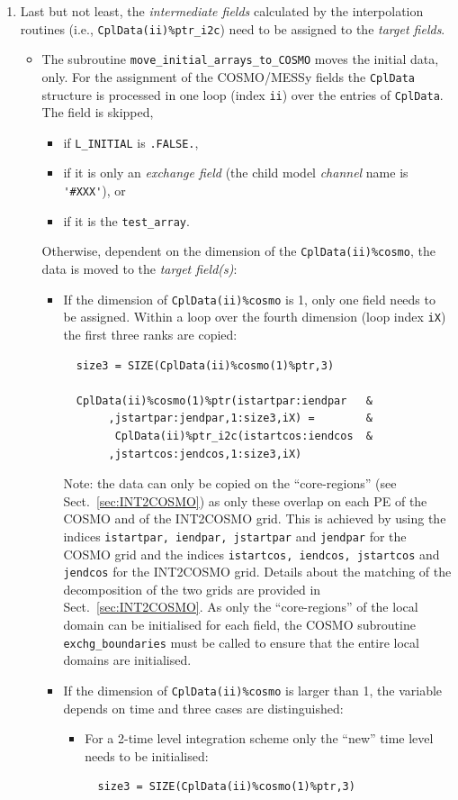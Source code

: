 \documentclass[11pt,twoside]{article}
\begin{document}
\begin{enumerate}
\item Last but not least, the {\it intermediate fields}
 calculated by the interpolation routines (i.e., \verb|CplData(ii)%ptr_i2c|) 
need to be assigned to the {\it target fields}.  
\begin{itemize} %
\item The subroutine \verb|move_initial_arrays_to_COSMO| moves the initial
data, only.
For the assignment of the COSMO/MESSy fields the \verb|CplData| structure is
processed in one loop (index \verb|ii|) over the entries of \verb|CplData|.
The field is skipped,
\begin{itemize}
\item  if \verb|L_INITIAL| is \verb|.FALSE.|,
\item if it is only an {\it exchange field} (the child model {\it
channel} name is \verb|'#XXX'|), or 
\item if it is the \verb|test_array|. 
\end{itemize}
Otherwise, dependent on the dimension of the 
\verb|CplData(ii)%cosmo|, the data is moved to the {\it target field(s)}:
\begin{itemize}
\item If the dimension of \verb|CplData(ii)%cosmo| is 1, only one field 
      needs to be assigned. Within a loop over the fourth dimension (loop index
      \verb|iX|) the first three ranks are copied:
\begin{verbatim}
  size3 = SIZE(CplData(ii)%cosmo(1)%ptr,3)

  CplData(ii)%cosmo(1)%ptr(istartpar:iendpar   &
       ,jstartpar:jendpar,1:size3,iX) =        &
        CplData(ii)%ptr_i2c(istartcos:iendcos  &
       ,jstartcos:jendcos,1:size3,iX)
\end{verbatim} 
Note: the data can only be copied on the ``core-regions'' (see Sect.\ 
\ref{sec:INT2COSMO}) as only these
 overlap on each PE of the COSMO and of the INT2COSMO grid. 
This is achieved by using the indices 
\verb|istartpar, iendpar, jstartpar| and \verb|jendpar| for the COSMO grid and
the indices \verb|istartcos, iendcos, jstartcos| and \verb|jendcos| for the
INT2COSMO grid. Details about the matching of the decomposition of the two
grids are provided in Sect.\ \ref{sec:INT2COSMO}.
As only the ``core-regions'' of the local domain can be initialised for each 
field, the COSMO subroutine \verb|exchg_boundaries| must be called to ensure 
that the entire local domains are initialised.

\item If the dimension of \verb|CplData(ii)%cosmo| is larger than 1,  
      the variable depends on time and three cases are distinguished:
\begin{itemize} %
 \item For a 2-time level integration scheme only the ``new'' time level needs 
      to be initialised:
\begin{verbatim}
  size3 = SIZE(CplData(ii)%cosmo(1)%ptr,3)


\end{verbatim}
\end{itemize}
\end{itemize}
\end{itemize}
\end{enumerate}
\end{document}
